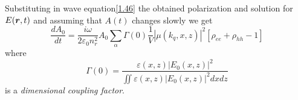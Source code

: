 Substituting in wave equation\eqref{1.46} the obtained polarization and solution for $E(\mbox{\boldmath $r$}, t)$ and assuming that $A(t)$ changes slowly we get
\begin{equation}
	\frac{d A_0}{d t} = \frac{i \omega}{2 \varepsilon_0 n_r^2} A_0 \sum_\alpha \Gamma(0) \frac{1}{V} |\mu(k_q, x, z)|^2[\rho_{ee} + \rho_{hh} - 1]
\end{equation}
where 
\begin{equation*}
	\Gamma(0) = \frac{\varepsilon(x,z) |E_0(x,z)|^2}{\iint \varepsilon(x,z) |E_0(x,z)|^2 dx d z}
\end{equation*}
is a \textit{dimensional coupling factor}.